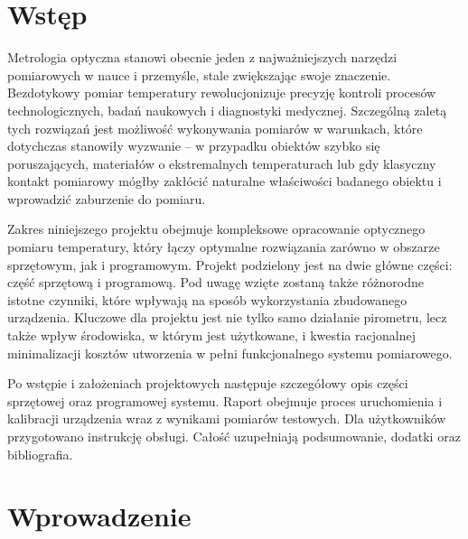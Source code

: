 \chapter{Wstęp}

Metrologia optyczna stanowi obecnie jeden z najważniejszych narzędzi pomiarowych w nauce i przemyśle, stale zwiększając swoje znaczenie. Bezdotykowy pomiar temperatury rewolucjonizuje precyzję kontroli procesów technologicznych, badań naukowych i diagnostyki medycznej. Szczególną zaletą tych rozwiązań jest możliwość wykonywania pomiarów w warunkach, które dotychczas stanowiły wyzwanie – w przypadku obiektów szybko się poruszających, materiałów o ekstremalnych temperaturach lub gdy klasyczny kontakt pomiarowy mógłby zakłócić naturalne właściwości badanego obiektu i wprowadzić zaburzenie do pomiaru.

\vspace{12pt}

Zakres niniejszego projektu obejmuje kompleksowe opracowanie optycznego pomiaru temperatury, który łączy optymalne rozwiązania zarówno w obszarze sprzętowym, jak i programowym. Projekt podzielony jest na dwie główne części: część sprzętową i programową. Pod uwagę wzięte zostaną także różnorodne istotne czynniki, które wpływają na sposób wykorzystania zbudowanego urządzenia. Kluczowe dla projektu jest nie tylko samo działanie pirometru, lecz także wpływ środowiska, w którym jest użytkowane, i kwestia racjonalnej minimalizacji kosztów utworzenia w pełni funkcjonalnego systemu pomiarowego.

\vspace{12pt}

Po wstępie i założeniach projektowych następuje szczegółowy opis części sprzętowej oraz programowej systemu. Raport obejmuje proces uruchomienia i kalibracji urządzenia wraz z wynikami pomiarów testowych. Dla użytkowników przygotowano instrukcję obsługi. Całość uzupełniają podsumowanie, dodatki oraz bibliografia.

\chapter{Wprowadzenie}


